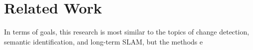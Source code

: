 \section{Related Work}
\label{sec:related_work}

In terms of goals, this research is most similar to the topics of change detection, semantic identification, and long-term SLAM, but the methods e

% 